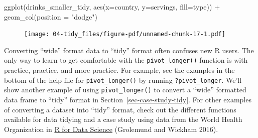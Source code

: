\documentclass[
  letterpaper,
  DIV=11,
  numbers=noendperiod]{scrreprt}
\newenvironment{Shaded}{\begin{snugshade}}{\end{snugshade}}
\newcommand{\AttributeTok}[1]{\textcolor[rgb]{0.40,0.45,0.13}{#1}}
\newcommand{\FunctionTok}[1]{\textcolor[rgb]{0.28,0.35,0.67}{#1}}
\newcommand{\NormalTok}[1]{\textcolor[rgb]{0.00,0.23,0.31}{#1}}
\newcommand{\SpecialCharTok}[1]{\textcolor[rgb]{0.37,0.37,0.37}{#1}}
\newcommand{\StringTok}[1]{\textcolor[rgb]{0.13,0.47,0.30}{#1}}
\theoremstyle{definition}
\theoremstyle{remark}
\begin{document}
\begin{Shaded}
\begin{Highlighting}[]
\FunctionTok{ggplot}\NormalTok{(drinks\_smaller\_tidy, }\FunctionTok{aes}\NormalTok{(}\AttributeTok{x=}\NormalTok{country, }\AttributeTok{y=}\NormalTok{servings, }\AttributeTok{fill=}\NormalTok{type)) }\SpecialCharTok{+}
  \FunctionTok{geom\_col}\NormalTok{(}\AttributeTok{position =} \StringTok{"dodge"}\NormalTok{)}
\end{Highlighting}
\end{Shaded}

\begin{figure}[H]

{\centering \texttt{[image: 04-tidy\_files/figure-pdf/unnamed-chunk-17-1.pdf]}

}

\end{figure}

Converting ``wide'' format data to ``tidy'' format often confuses new R
users. The only way to learn to get comfortable with the
\texttt{pivot\_longer()} function is with practice, practice, and more
practice. For example, see the examples in the bottom of the help file
for \texttt{pivot\_longer()} by running \texttt{?pivot\_longer}. We'll
show another example of using \texttt{pivot\_longer()} to convert a
``wide'' formatted data frame to ``tidy'' format in
Section~\ref{sec-case-study-tidy}. For other examples of converting a
dataset into ``tidy'' format, check out the different functions
available for data tidying and a case study using data from the World
Health Organization in \href{http://r4ds.had.co.nz/tidy-data.html}{R for
Data Science} (Grolemund and Wickham 2016).
\end{document}
